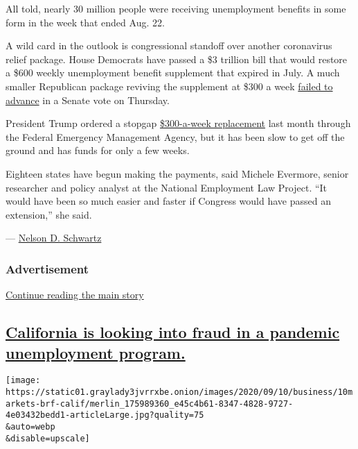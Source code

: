 All told, nearly 30 million people were receiving unemployment benefits
in some form in the week that ended Aug. 22.

A wild card in the outlook is congressional standoff over another
coronavirus relief package. House Democrats have passed a \$3 trillion
bill that would restore a \$600 weekly unemployment benefit supplement
that expired in July. A much smaller Republican package reviving the
supplement at \$300 a week
\href{https://www.nytimes3xbfgragh.onion/2020/09/10/world/covid-19-coronavirus.html\#link-3c53e6c9}{failed
to advance} in a Senate vote on Thursday.

President Trump ordered a stopgap
\href{https://www.nytimes3xbfgragh.onion/article/stimulus-unemployment-payment-benefit.html}{\$300-a-week
replacement} last month through the Federal Emergency Management Agency,
but it has been slow to get off the ground and has funds for only a few
weeks.

Eighteen states have begun making the payments, said Michele Evermore,
senior researcher and policy analyst at the National Employment Law
Project. ``It would have been so much easier and faster if Congress
would have passed an extension,'' she said.

---
\href{https://www.nytimes3xbfgragh.onion/by/nelson-d-schwartz}{Nelson D.
Schwartz}

\hypertarget{advertisement}{%
\subsubsection{Advertisement}\label{advertisement}}

\protect\hyperlink{after-dfp-ad-mid1}{Continue reading the main story}

\hypertarget{california-is-looking-into-fraud-in-a-pandemic-unemployment-program}{%
\subsection{\texorpdfstring{\protect\hyperlink{california-is-looking-into-fraud-in-a-pandemic-unemployment-program}{California
is looking into fraud in a pandemic unemployment
program.}}{California is looking into fraud in a pandemic unemployment program.}}\label{california-is-looking-into-fraud-in-a-pandemic-unemployment-program}}

\texttt{[image: https://static01.graylady3jvrrxbe.onion/images/2020/09/10/business/10markets-brf-calif/merlin\_175989360\_e45c4b61-8347-4828-9727-4e03432bedd1-articleLarge.jpg?quality=75\\\&auto=webp\\\&disable=upscale]}

